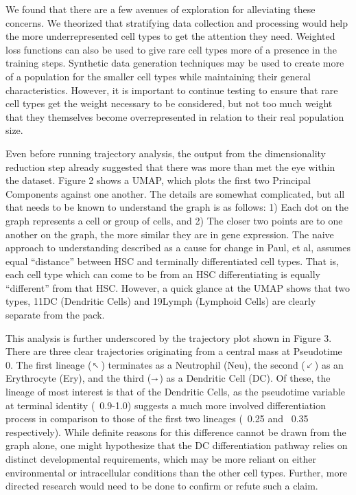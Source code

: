 \documentclass{article}
\makeatletter
\newcommand{\fixed@sra}{$\vrule height 2\fontdimen22\textfont2 width 0pt\shortrightarrow$}
\newcommand{\shortarrow}[1]{%
  \mathrel{\text{\rotatebox[origin=c]{\numexpr#1*45}{\fixed@sra}}}%
}
\makeatother
\begin{document}
We found that there are a few avenues of exploration for alleviating these concerns. We theorized that stratifying data collection and processing would help the more underrepresented cell types to get the attention they need. Weighted loss functions can also be used to give rare cell types more of a presence in the training steps. Synthetic data generation techniques may be used to create more of a population for the smaller cell types while maintaining their general characteristics. However, it is important to continue testing to ensure that rare cell types get the weight necessary to be considered, but not too much weight that they themselves become overrepresented in relation to their real population size. 

Even before running trajectory analysis, the output from the dimensionality reduction step already suggested that there was more than met the eye within the dataset. Figure 2 shows a UMAP, which plots the first two Principal Components against one another. The details are somewhat complicated, but all that needs to be known to understand the graph is as follows: 1) Each dot on the graph represents a cell or group of cells, and 2) The closer two points are to one another on the graph, the more similar they are in gene expression. The naive approach to understanding described as a cause for change in Paul, et al, assumes equal “distance” between HSC and terminally differentiated cell types. That is, each cell type which can come to be from an HSC differentiating is equally “different” from that HSC. However, a quick glance at the UMAP shows that two types, 11DC (Dendritic Cells) and 19Lymph (Lymphoid Cells) are clearly separate from the pack. 

This analysis is further underscored by the trajectory plot shown in Figure 3. There are three clear trajectories originating from a central mass at Pseudotime 0. The first lineage ($\shortarrow{3}$) terminates as a Neutrophil (Neu), the second ($\shortarrow{5}$) as an Erythrocyte (Ery), and the third ($\shortarrow{0}$) as a Dendritic Cell (DC). Of these, the lineage of most interest is that of the Dendritic Cells, as the pseudotime variable at terminal identity (~0.9-1.0) suggests a much more involved differentiation process in comparison to those of the first two lineages (~0.25 and ~0.35 respectively). While definite reasons for this difference cannot be drawn from the graph alone, one might hypothesize that the DC differentiation pathway relies on distinct developmental requirements, which may be more reliant on either environmental or intracellular conditions than the other cell types. Further, more directed research would need to be done to confirm or refute such a claim.
\end{document}
